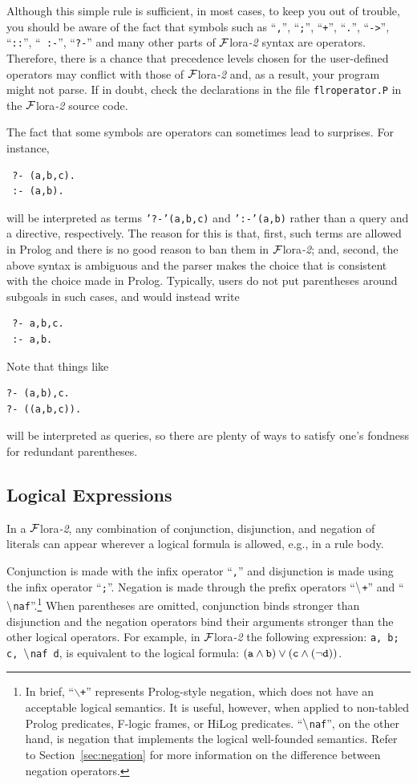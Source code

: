 \documentclass[11pt]{article}
\newcommand{\FLSYSTEM}{{\mbox{\sc ${\cal F}${lora}\rm\emph{-2}}}\xspace}
\newcommand{\PLGNAF}{\mbox{\tt \ensuremath{\tt\backslash}+}\xspace}
\newcommand{\RULELOGNAF}{{\texttt{\ensuremath{\tt\backslash}naf}}\xspace}
\begin{document}
Although this simple rule is sufficient, in most cases, to keep you out of
trouble, you should be aware of the fact that symbols such as ``{\tt ,}'',
``{\tt ;}'', ``{\tt +}'', ``{\tt .}'', ``{\tt ->}'', ``{\tt ::}'', ``{\tt
  :-}'', ``{\tt ?-}'' and many
other parts of \FLSYSTEM syntax are operators. Therefore, there is a chance
that precedence levels chosen for the user-defined operators may conflict with
those of \FLSYSTEM and, as a result, your program might not parse. If in
doubt, check the declarations in the file {\tt flroperator.P} in the \FLSYSTEM
source code.

The fact that some symbols are operators can sometimes lead to
surprises. For instance,
\begin{verbatim}
 ?- (a,b,c).
 :- (a,b).
\end{verbatim}
will be interpreted as terms {\tt '?-'(a,b,c)} and {\tt ':-'(a,b)} rather
than a query and a directive, respectively. The reason for this is that,
first, such terms are allowed in Prolog and there is no good reason to ban
them in \FLSYSTEM; and, second, the above syntax is ambiguous and the parser
makes the choice that is consistent with the choice made in
Prolog. Typically, users do not put parentheses around subgoals in such
cases, and would instead write
\begin{verbatim}
 ?- a,b,c.
 :- a,b.  
\end{verbatim}
Note that things like
\begin{verbatim}
?- (a,b),c.  
?- ((a,b,c)).
\end{verbatim}
will be interpreted as queries, so there are plenty of ways to satisfy
one's fondness for redundant parentheses.


\subsection{Logical Expressions}


%
In a \FLSYSTEM, any combination of conjunction, disjunction, and
negation of literals can appear wherever a logical formula is allowed,
e.g., in a rule body.

Conjunction is made with the infix operator ``{\tt ,}'' and
disjunction is made using the infix operator ``{\tt ;}''.  Negation is made
through the prefix operators ``\PLGNAF'' and ``\RULELOGNAF''.\footnote{
  In brief, ``{\tt $\backslash$+}'' represents Prolog-style negation, which
  does not have an acceptable logical semantics. It is useful, however,
  when applied
  to non-tabled Prolog predicates, F-logic frames, or HiLog
  predicates. ``\RULELOGNAF'', on the other hand, is negation that
  implements the logical well-founded semantics.  Refer to
  Section~\ref{sec:negation} for more information on the difference between
  negation operators. 
  }
When parentheses are omitted, conjunction binds stronger than disjunction
and the negation operators bind their arguments stronger than the other
logical operators.  For example, in \FLSYSTEM the following expression:
{\tt a, b; c, \RULELOGNAF d}, is equivalent to the logical formula: $\tt (a
\wedge b) \vee (c \wedge (\neg d))$.
\end{document}

